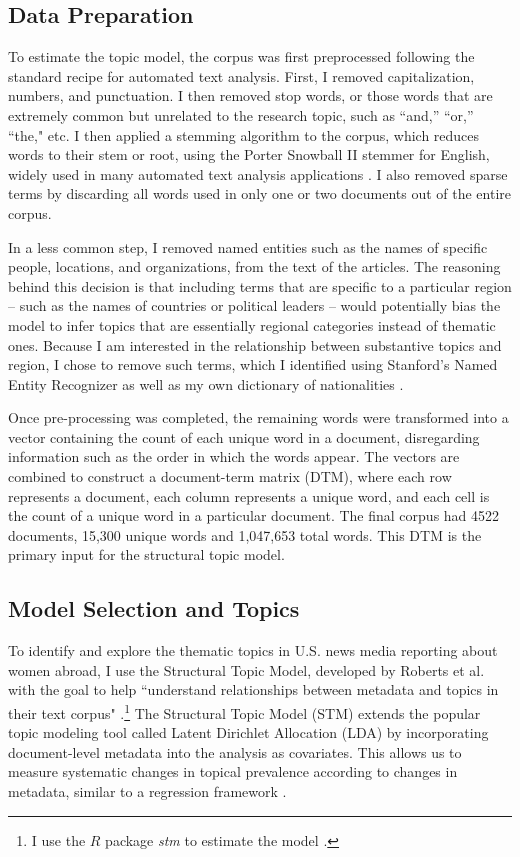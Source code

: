 \documentclass[11pt, oneside]{article}
\begin{document}
\subsection{Data Preparation}

To estimate the topic model, the corpus was first preprocessed following the standard recipe for automated text analysis. First, I removed capitalization, numbers, and punctuation. I then removed stop words, or those words that are extremely common but unrelated to the research topic, such as ``and,'' ``or,'' ``the," etc.  I then applied a stemming algorithm to the corpus, which reduces words to their stem or root, using the Porter Snowball II stemmer for English, widely used in many automated text analysis applications \cite{porter2001,willett2006porter}. I also removed sparse terms by discarding all words used in only one or two documents out of the entire corpus. 

In a less common step, I removed named entities such as the names of specific people, locations, and organizations, from the text of the articles. The reasoning behind this decision is that including terms that are specific to a particular region -- such as the names of countries or political leaders -- would potentially bias the model to infer topics that are essentially regional categories instead of thematic ones. Because I am interested in the relationship between substantive topics and region, I chose to remove such terms, which I identified using Stanford's Named Entity Recognizer as well as my own dictionary of nationalities \cite{finkel2005incorporating}.

Once pre-processing was completed, the remaining words were transformed into a vector containing the count of each unique word in a document, disregarding information such as the order in which the words appear.  The vectors are combined to construct a document-term matrix (DTM), where each row represents a document, each column represents a unique word, and each cell is the count of a unique word in a particular document. The final corpus had 4522 documents, 15,300 unique words and 1,047,653 total words. This DTM is the primary input for the structural topic model. 
	
\subsection{Model Selection and Topics}

To identify and explore the thematic topics in U.S. news media reporting about women abroad, I use the Structural Topic Model, developed by Roberts et al. \cite{roberts2013structural} with the goal to help ``understand relationships between metadata and topics in their text corpus" \cite[p. 2]{lucas2015computer}.\footnote{\hspace{5}I use the $R$ package \emph{stm} to estimate the model \cite{roberts2014stm}.} The Structural Topic Model (STM) extends the popular topic modeling tool called Latent Dirichlet Allocation (LDA) by incorporating document-level metadata into the analysis as covariates. This allows us to measure systematic changes in topical prevalence according to changes in metadata, similar to a regression framework \cite[p. 5]{roberts2014}.
\end{document}
